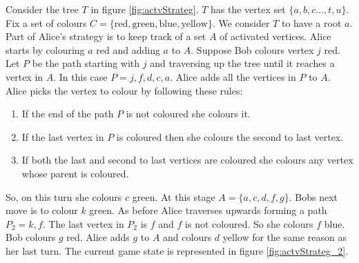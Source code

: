 Consider the tree $T$ in figure \ref{fig:actvStrateg}. $T$ has the vertex set $\{a,b,c\dots,t,u\}$. Fix a set of colours $C=\{\text{red},\text{green},\text{blue},\text{yellow}\}$. We consider $T$ to have a root $a$. Part of Alice's strategy is to keep track of a set $A$ of activated vertices. Alice starts by colouring $a$ red and adding $a$ to $A$. Suppose Bob colours vertex $j$ red. 
Let $P$ be the path starting with $j$ and traversing up the tree until it reaches a vertex in $A$. In this case $P= j, f, d, c, a$. Alice adds all the vertices in $P$ to $A$. Alice picks the vertex to colour by following these rules:
%
\begin{enumerate}
    \item If the end of the path $P$ is not coloured she colours it. 
    \item If the last vertex in $P$ is coloured then she colours the second to last vertex. 
    \item If both the last and second to last vertices are coloured she colours any vertex whose parent is coloured. 
\end{enumerate}
%
So, on this turn she colours $c$ green. At this stage $A=\{a,c,d,f,g\}$. Bobs next move is to colour $k$ green. As before Alice traverses upwards forming a path $P_2=k,f$. The last vertex in $P_2$ is $f$ and $f$ is not coloured. So she colours $f$ blue. Bob colours $g$ red. Alice adds $g$ to $A$ and colours $d$ yellow for the same reason as her last turn. The current game state is represented in figure \ref{fig:actvStrateg_2}.
 
